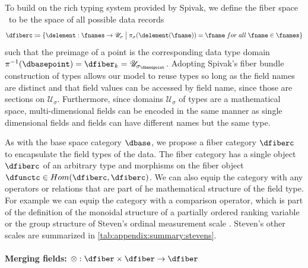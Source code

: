\documentclass[journal]{IEEEtran}
\theoremstyle{definition}
\theoremstyle{remark}
\begin{document}
To build on the rich typing system provided by Spivak, we define the \textcolor{fiber}{fiber space} \dfiberc\ to be the space of all possible data records
\begin{equation}
  \dfiberc \coloneqq \{\delement: \fnames \rightarrow \mathscr{U}_{\sigma} \bigm{\vert} \pi_{\sigma}(\delement(\fname)) = \fname\;for\;all\; \fname \in \fnames \}
\end{equation}
such that the preimage of a point is the corresponding data type domain $\pi^{-1}(\dbasepoint) = \dfiber_{k} = \mathscr{U}_{{\sigma}_{\dbasepoint}}$.
Adopting Spivak's fiber bundle construction of types allows our model to reuse types so long as the field names are distinct and that field values can be accessed by field name,  since those are sections on $\mathcal{U}_{\sigma}$. Furthermore, since domains $\mathscr{U}_{{\sigma}}$ of types are a mathematical space, multi-dimensional fields can be encoded in the same manner as single dimensional fields and fields can have different names but the same type.

As with the base space category $\mathcal{\dbase}$, we propose a fiber category $\mathcal{\dfiberc}$ to encapsulate the field types of the data. The fiber category has a single object $\dfiberc$ of an arbitrary type and morphisms on the fiber object $\dfunctc \in Hom(\dfiberc, \dfiberc)$. We can also equip the category with any operators or relations that are part of he mathematical structure of the field type. For example we can equip the category with a comparison operator, which is part of the definition of the monoidal structure of a partially ordered ranking variable \cite{bruggemannRankingPrioritizationMultiindicator2011} or the group structure of Steven's ordinal measurement scale \cite{stevensTheoryScalesMeasurement1946, leaFormalizationMeasurementScale1971, thomasMathematizationNotMeasurement2014}. Steven's other scales are summarized in \autoref{tab:appendix:summary:stevens}.

\paragraph{Merging fields: $\otimes: \mathcal{\dfiber} \times \mathcal{\dfiber} \rightarrow \mathcal{\dfiber}$ }
\end{document}
